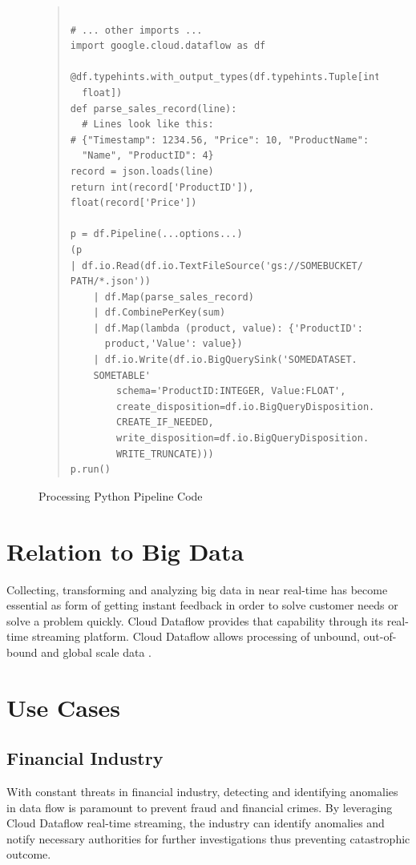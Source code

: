 \documentclass[9pt,twocolumn,twoside]{../../styles/osajnl}
\begin{document}
\begin{figure}[htb]
\begin{quote}
\begin{Verbatim}
    
# ... other imports ...
import google.cloud.dataflow as df

@df.typehints.with_output_types(df.typehints.Tuple[int,
  float])
def parse_sales_record(line):
  # Lines look like this:
# {"Timestamp": 1234.56, "Price": 10, "ProductName":
  "Name", "ProductID": 4}
record = json.loads(line)
return int(record['ProductID']), float(record['Price'])

p = df.Pipeline(...options...)
(p
| df.io.Read(df.io.TextFileSource('gs://SOMEBUCKET/
PATH/*.json'))
    | df.Map(parse_sales_record)
    | df.CombinePerKey(sum)
    | df.Map(lambda (product, value): {'ProductID':
      product,'Value': value})
    | df.io.Write(df.io.BigQuerySink('SOMEDATASET.
    SOMETABLE'
        schema='ProductID:INTEGER, Value:FLOAT',
        create_disposition=df.io.BigQueryDisposition.
        CREATE_IF_NEEDED,
        write_disposition=df.io.BigQueryDisposition.
        WRITE_TRUNCATE)))
p.run() \end{Verbatim}
\end{quote}
\caption{Processing Python Pipeline Code \cite{www-pythoncode}}\label{alg:python}
\end{figure}

\section{Relation to Big Data}

Collecting, transforming and analyzing big data in near real-time has
become essential as form of getting instant feedback in order to solve
customer needs or solve a problem quickly. Cloud Dataflow provides
that capability through its real-time streaming platform. Cloud
Dataflow allows processing of unbound, out-of-bound and global scale
data \cite{www-statefulprocess}.

\section{Use Cases}

\subsection{Financial Industry}

With constant threats in financial industry, detecting and identifying
anomalies in data flow is paramount to prevent fraud and financial
crimes. By leveraging Cloud Dataflow real-time streaming, the industry
can identify anomalies and notify necessary authorities for further
investigations thus preventing catastrophic outcome.
\end{document}
